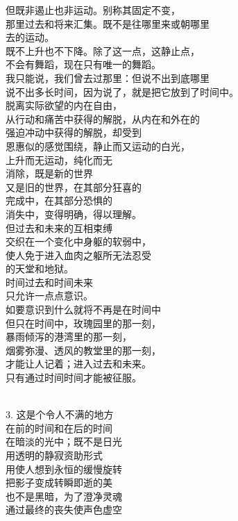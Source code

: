 \documentclass{article}
\begin{document}
但既非遏止也非运动。别称其固定不变，\\
那里过去和将来汇集。既不是往哪里来或朝哪里\\
去的运动。\\
既不上升也不下降。除了这一点，这静止点，\\
不会有舞蹈，现在只有唯一的舞蹈。
\newpage
\\
我只能说，我们曾去过那里：但说不出到底哪里\\
说不出多长时间，因为说了，就是把它放到了时间中。\\
脱离实际欲望的内在自由，\\
从行动和痛苦中获得的解脱，从内在和外在的\\
强迫冲动中获得的解脱，却受到\\
恩惠似的感觉围绕，静止而又运动的白光，\\
上升而无运动，纯化而无\\
消除，既是新的世界\\
又是旧的世界，在其部分狂喜的\\
完成中，在其部分恐惧的\\
消失中，变得明确，得以理解。\\
但过去和未来的互相束缚\\
交织在一个变化中身躯的软弱中，\\
使人免于进入血肉之躯所无法忍受\\
的天堂和地狱。\\
时间过去和时间未来\\
只允许一点点意识。\\
如要意识到什么就将不再是在时间中\\
但只在时间中，玫瑰园里的那一刻，\\
暴雨倾泻的港湾里的那一刻，
\newpage
\\
烟雾弥漫、透风的教堂里的那一刻，\\
才能让人记着；进入过去和未来。\\
只有通过时间时间才能被征服。 \par \\
3. 这是个令人不满的地方\\
在前的时间和在后的时间\\
在暗淡的光中；既不是日光\\
用透明的静寂资助形式\\
用使人想到永恒的缓慢旋转\\
把影子变成转瞬即逝的美\\
也不是黑暗，为了澄净灵魂\\
通过最终的丧失使声色虚空\\
\end{document}
